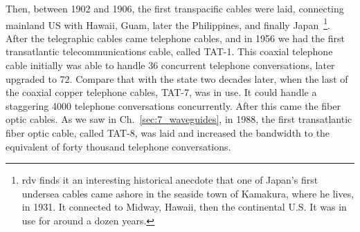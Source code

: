 Then, between 1902 and 1906, the first transpacific cables were laid, connecting mainland US with Hawaii, Guam, later the Philippines, and finally Japan~\footnote{rdv finds it an interesting historical anecdote that one of Japan's first undersea cables came ashore in the seaside town of Kamakura, where he lives, in 1931.  It connected to Midway, Hawaii, then the continental U.S.  It was in use for around a dozen years.}. After the telegraphic cables came telephone cables, and in 1956 we had the first transatlantic telecommunications cable, called TAT-1. This coaxial telephone cable initially was able to handle 36 concurrent telephone conversations, later upgraded to 72. 
Compare that with the state two decades later, when the last of the coaxial copper 
telephone cables, TAT-7, was in use. It could handle a staggering 4000 telephone conversations concurrently. After this came the fiber optic cables. As we saw in Ch.~\ref{sec:7_waveguides}, in 1988, the first transatlantic fiber optic cable, called TAT-8, was laid and increased the bandwidth to the equivalent of forty thousand telephone conversations.


